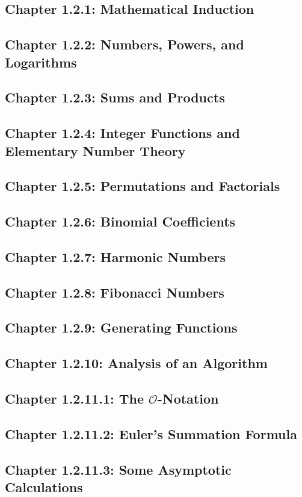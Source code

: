 \documentclass{article}
\renewcommand{\O}{$\mathcal{O}$}
\begin{document}
		\subsection{Chapter 1.2.1: Mathematical Induction}
		
		\subsection{Chapter 1.2.2: Numbers, Powers, and Logarithms}
		
		\subsection{Chapter 1.2.3: Sums and Products}
		
		\subsection{Chapter 1.2.4: Integer Functions and Elementary Number Theory}
		
		\subsection{Chapter 1.2.5: Permutations and Factorials}
		
		\subsection{Chapter 1.2.6: Binomial Coefficients}
		
		\subsection{Chapter 1.2.7: Harmonic Numbers}
		
		\subsection{Chapter 1.2.8: Fibonacci Numbers}
		
		\subsection{Chapter 1.2.9: Generating Functions}
		
		\subsection{Chapter 1.2.10: Analysis of an Algorithm}
		
		\subsection{Chapter 1.2.11.1: The \O{}-Notation}
		
		\subsection{Chapter 1.2.11.2: Euler's Summation Formula}
		
		\subsection{Chapter 1.2.11.3: Some Asymptotic Calculations}
			
\end{document}

